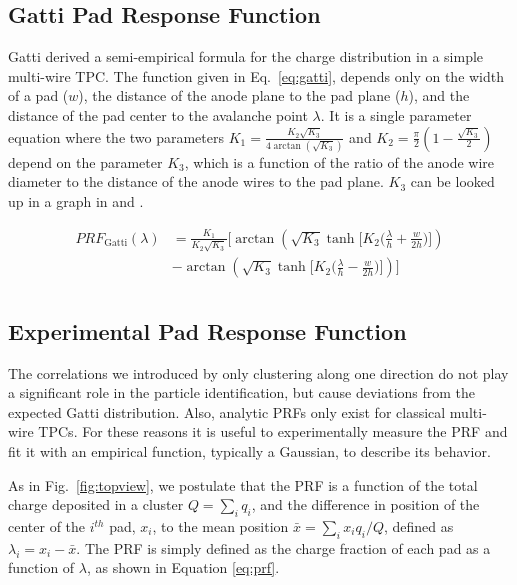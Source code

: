 \documentclass[review,number,sort&compress]{elsarticle}
\begin{document}
\subsection{Gatti Pad Response Function}
Gatti \cite{gatti} derived a semi-empirical formula for the charge distribution in a simple multi-wire TPC. The function given in Eq.~\ref{eq:gatti}, depends only on the width of a pad ($w$), the distance of the anode plane to the pad plane ($h$), and the distance of the pad center to the avalanche point $\lambda$. It is a single parameter equation where the two parameters $K_1 = \frac{K_{2}\sqrt{K_3}}{4 \arctan(\sqrt{K_3})}$ and $K_2 = \frac{\pi}{2}\left(1-\frac{\sqrt{K_{3}}}{2}\right)$ depend on the parameter $K_3$, which is a function of the ratio of the anode wire diameter to the distance of the anode wires to the pad plane. $K_3$ can be looked up in a graph in \cite{blumrol} and \citep{gatti}.

\begin{equation}\label{eq:gatti}
\begin{split}
PRF_{\mathrm{Gatti}}(\lambda)
& = \frac{K_{1}}{K_{2}\sqrt{K_{3}}}\bigl[\arctan(\sqrt{K_{3}}\tanh\bigl[K_{2}\bigl(\frac{\lambda}{h}+\frac{w}{2h}\bigr)\bigr]) \\
& - \arctan(\sqrt{K_{3}}\tanh\bigl[K_{2}\bigl(\frac{\lambda}{h}-\frac{w}{2h}\bigr)\bigr])\bigr] \\
\end{split}
\end{equation}

\subsection{Experimental Pad Response Function}

The correlations we introduced by only clustering along one direction do not play a significant role in the particle identification, but cause deviations from the expected Gatti distribution. Also, analytic PRFs only exist for classical multi-wire TPCs. For these reasons it is useful to experimentally measure the PRF and fit it with an empirical function, typically a Gaussian, to describe its behavior. 

As in Fig.~\ref{fig:topview}, we postulate that the PRF is a function of the total charge deposited in a cluster $Q = \sum_i q_i$, and the difference in position of the center of the $i^{th}$ pad, $x_i$, to the mean position $\bar{x} = \sum_i x_i q_i/Q$, defined as $\lambda_i = x_i-\bar{x}$. The PRF is simply defined as the charge fraction of each pad as a function of $\lambda$, as shown in Equation \ref{eq:prf}. 
\end{document}
